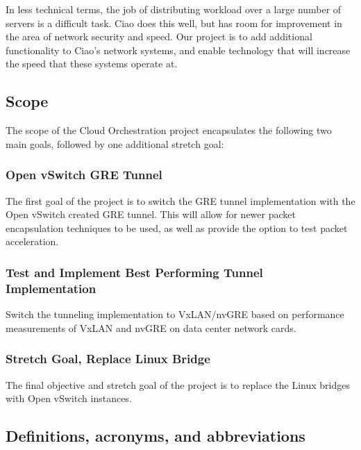\documentclass[10pt,letterpaper,onecolumn,draftclsnofoot]{IEEEtran}
\begin{document}
In less technical terms, the job of distributing workload over a large number of servers is a difficult
task. Ciao does this well, but has room for improvement in the area of network security and speed. Our
project is to add additional functionality to Ciao's network systems, and enable technology that will
increase the speed that these systems operate at.

\subsection{Scope}

The scope of the Cloud Orchestration project encapsulates the following two main goals, followed
by one additional stretch goal:

\subsubsection{Open vSwitch GRE Tunnel}

The first goal of the project is to switch the GRE tunnel implementation with the Open vSwitch
created GRE tunnel. This will allow for newer packet encapsulation techniques to be used, as
well as provide the option to test packet acceleration.

\subsubsection{Test and Implement Best Performing Tunnel Implementation}

Switch the tunneling implementation to VxLAN/nvGRE based on performance measurements of VxLAN and nvGRE
on data center network cards.

\subsubsection{Stretch Goal, Replace Linux Bridge}

The final objective and stretch goal of the project is to replace the Linux bridges with Open
vSwitch instances.


\subsection{Definitions, acronyms, and abbreviations}
\end{document}
